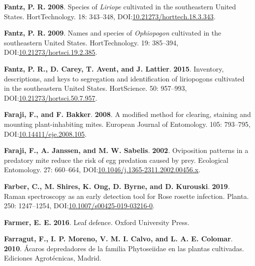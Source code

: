 \documentclass[12pt,final,CPage]{ufthesis}
\newlength{\cslhangindent}
\newenvironment{CSLReferences}[2] %
{%
	\setlength{\parindent}{0pt}
	\ifodd #1 \everypar{\setlength{\hangindent}{\cslhangindent}}\ignorespaces\fi
	\ifnum #2 > 0
	\setlength{\parskip}{#2\baselineskip}
	\fi
}%
{}
\begin{document}
{\begin{CSLReferences}{1}{0}
  \leavevmode{}%
  \textbf{Fantz, P. R.} \textbf{2008}. Species of {\emph{Liriope}} cultivated in the southeastern {United States}. {HortTechnology}. 18: 343--348, DOI:\href{https://doi.org/10.21273/horttech.18.3.343}{10.21273/horttech.18.3.343}.

  \leavevmode{}%
  \textbf{Fantz, P. R.} \textbf{2009}. Names and species of {\emph{Ophiopogon}} cultivated in the southeastern {United States}. {HortTechnology}. 19: 385--394, DOI:\href{https://doi.org/10.21273/hortsci.19.2.385}{10.21273/hortsci.19.2.385}.

  \leavevmode{}%
  \textbf{Fantz, P. R., D. Carey, T. Avent, and J. Lattier}. \textbf{2015}. Inventory, descriptions, and keys to segregation and identification of liriopogons cultivated in the southeastern {United States}. {HortScience}. 50: 957--993, DOI:\href{https://doi.org/10.21273/hortsci.50.7.957}{10.21273/hortsci.50.7.957}.

  \leavevmode{}%
  \textbf{Faraji, F., and F. Bakker}. \textbf{2008}. A modified method for clearing, staining and mounting plant-inhabiting mites. European Journal of Entomology. 105: 793--795, DOI:\href{https://doi.org/10.14411/eje.2008.105}{10.14411/eje.2008.105}.

  \leavevmode{}%
  \textbf{Faraji, F., A. Janssen, and M. W. Sabelis}. \textbf{2002}. Oviposition patterns in a predatory mite reduce the risk of egg predation caused by prey. Ecological Entomology. 27: 660--664, DOI:\href{https://doi.org/10.1046/j.1365-2311.2002.00456.x}{10.1046/j.1365-2311.2002.00456.x}.

  \leavevmode{}%
  \textbf{Farber, C., M. Shires, K. Ong, D. Byrne, and D. Kurouski}. \textbf{2019}. {Raman} spectroscopy as an early detection tool for {Rose rosette} infection. Planta. 250: 1247--1254, DOI:\href{https://doi.org/10.1007/s00425-019-03216-0}{10.1007/s00425-019-03216-0}.

  \leavevmode{}%
  \textbf{Farmer, E. E.} \textbf{2016}. Leaf defence. Oxford University Press.

  \leavevmode{}%
  \textbf{Farragut, F., I. P. Moreno, V. M. I. Calvo, and L. A. E. Colomar}. \textbf{2010}. {Á}caros depredadores de la familia {Phytoseiidae} en las plantas cultivadas. Ediciones Agrot{é}cnicas, Madrid.


\end{CSLReferences}}
\end{document}
